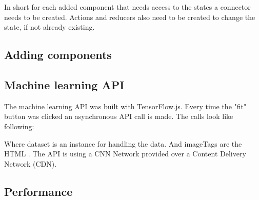 In short for each added component that needs access to the states a connector needs to be created. Actions and reducers also need to be created to change the state, if not already existing.

\subsection{Adding components}



\subsection{Machine learning API}
The machine learning API was built with TensorFlow.js. Every time the "fit" button was clicked an asynchronous API call is made. The calls look like following:



Where dataset is an instance for handling the data. And imageTags are the HTML . The API is using a CNN Network provided over a Content Delivery Network (CDN).
\subsection{Performance}








